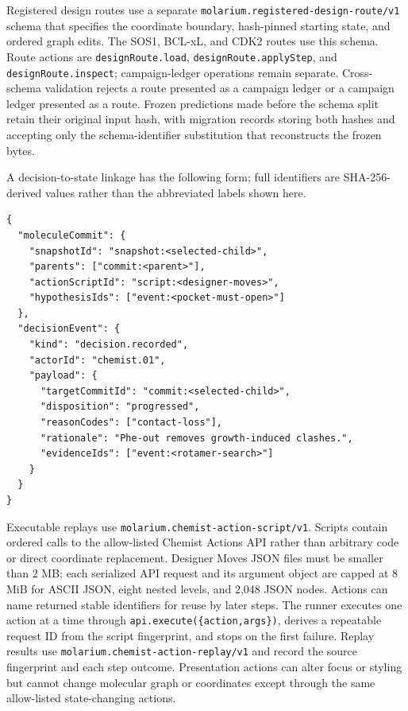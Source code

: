 \documentclass[11pt]{article}
\begin{document}
\begin{small}
Registered design routes use a separate \texttt{molarium.registered-design-route/v1} schema that specifies the coordinate boundary, hash-pinned starting state, and ordered graph edits. The SOS1, BCL-xL, and CDK2 routes use this schema. Route actions are \texttt{designRoute.load}, \texttt{designRoute.applyStep}, and \texttt{designRoute.inspect}; campaign-ledger operations remain separate. Cross-schema validation rejects a route presented as a campaign ledger or a campaign ledger presented as a route. Frozen predictions made before the schema split retain their original input hash, with migration records storing both hashes and accepting only the schema-identifier substitution that reconstructs the frozen bytes.

A decision-to-state linkage has the following form; full identifiers are SHA-256-derived values rather than the abbreviated labels shown here.

\begin{lstlisting}
{
  "moleculeCommit": {
    "snapshotId": "snapshot:<selected-child>",
    "parents": ["commit:<parent>"],
    "actionScriptId": "script:<designer-moves>",
    "hypothesisIds": ["event:<pocket-must-open>"]
  },
  "decisionEvent": {
    "kind": "decision.recorded",
    "actorId": "chemist.01",
    "payload": {
      "targetCommitId": "commit:<selected-child>",
      "disposition": "progressed",
      "reasonCodes": ["contact-loss"],
      "rationale": "Phe-out removes growth-induced clashes.",
      "evidenceIds": ["event:<rotamer-search>"]
    }
  }
}
\end{lstlisting}

Executable replays use \texttt{molarium.chemist-action-script/v1}. Scripts contain ordered calls to the allow-listed Chemist Actions API rather than arbitrary code or direct coordinate replacement. Designer Moves JSON files must be smaller than 2 MB; each serialized API request and its argument object are capped at 8 MiB for ASCII JSON, eight nested levels, and 2,048 JSON nodes. Actions can name returned stable identifiers for reuse by later steps. The runner executes one action at a time through \texttt{api.execute(\{action,args\})}, derives a repeatable request ID from the script fingerprint, and stops on the first failure. Replay results use \texttt{molarium.chemist-action-replay/v1} and record the source fingerprint and each step outcome. Presentation actions can alter focus or styling but cannot change molecular graph or coordinates except through the same allow-listed state-changing actions.


\end{small}
\end{document}

